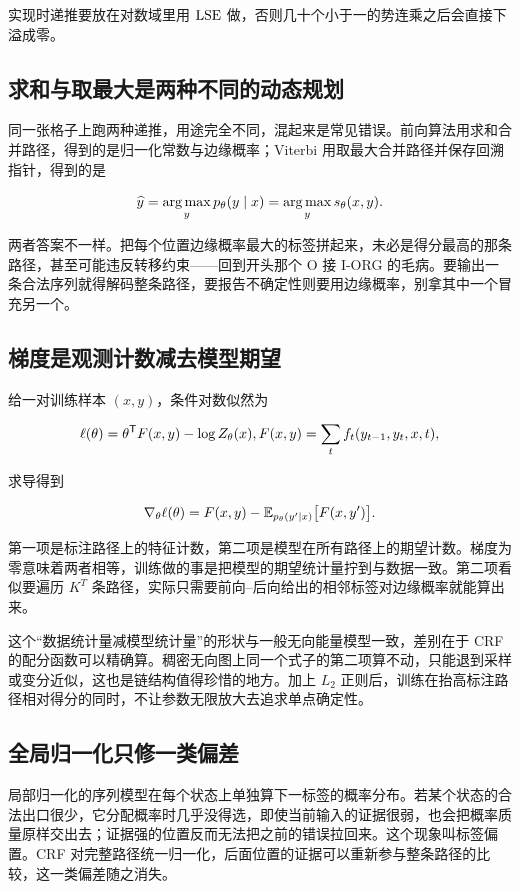 实现时递推要放在对数域里用 \(\operatorname{LSE}\) 做，否则几十个小于一的势连乘之后会直接下溢成零。

\subsection{求和与取最大是两种不同的动态规划}

同一张格子上跑两种递推，用途完全不同，混起来是常见错误。前向算法用求和合并路径，得到的是归一化常数与边缘概率；Viterbi 用取最大合并路径并保存回溯指针，得到的是

\[
\widehat y=\operatorname*{arg\,max}_y p_\theta(y\mid x)=\operatorname*{arg\,max}_y s_\theta(x,y).
\]

两者答案不一样。把每个位置边缘概率最大的标签拼起来，未必是得分最高的那条路径，甚至可能违反转移约束——回到开头那个 O 接 I-ORG 的毛病。要输出一条合法序列就得解码整条路径，要报告不确定性则要用边缘概率，别拿其中一个冒充另一个。

\subsection{梯度是观测计数减去模型期望}

给一对训练样本 \((x,y)\)，条件对数似然为

\[
\ell(\theta)=\theta^{\mathsf{T}}F(x,y)-\log Z_\theta(x),
\space
F(x,y)=\sum_t f_t(y_{t-1},y_t,x,t),
\]

求导得到

\[
\nabla_\theta\ell(\theta)
=F(x,y)-\mathbb{E}_{p_\theta(y'\mid x)}\bigl[F(x,y')\bigr].
\]

第一项是标注路径上的特征计数，第二项是模型在所有路径上的期望计数。梯度为零意味着两者相等，训练做的事是把模型的期望统计量拧到与数据一致。第二项看似要遍历 \(K^{T}\) 条路径，实际只需要前向--后向给出的相邻标签对边缘概率就能算出来。

这个``数据统计量减模型统计量''的形状与一般无向能量模型一致，差别在于 CRF 的配分函数可以精确算。稠密无向图上同一个式子的第二项算不动，只能退到采样或变分近似，这也是链结构值得珍惜的地方。加上 \(L_2\) 正则后，训练在抬高标注路径相对得分的同时，不让参数无限放大去追求单点确定性。

\subsection{全局归一化只修一类偏差}

局部归一化的序列模型在每个状态上单独算下一标签的概率分布。若某个状态的合法出口很少，它分配概率时几乎没得选，即使当前输入的证据很弱，也会把概率质量原样交出去；证据强的位置反而无法把之前的错误拉回来。这个现象叫标签偏置。CRF 对完整路径统一归一化，后面位置的证据可以重新参与整条路径的比较，这一类偏差随之消失。

